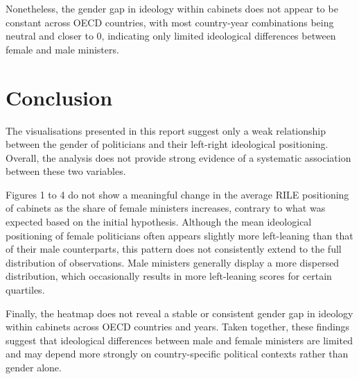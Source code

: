 \documentclass[12pt,letterpaper]{article}
\begin{document}
\noindent Nonetheless, the gender gap in ideology within cabinets does not appear to be constant across OECD countries, with most country-year combinations being neutral and closer to 0, indicating only limited ideological differences between female and male ministers.

\vspace{0.5cm}

\section{Conclusion}

\vspace{0.5cm}

\noindent The visualisations presented in this report suggest only a weak relationship between the gender of politicians and their left-right ideological positioning. Overall, the analysis does not provide strong evidence of a systematic association between these two variables.

\noindent Figures 1 to 4 do not show a meaningful change in the average RILE positioning of cabinets as the share of female ministers increases, contrary to what was expected based on the initial hypothesis. Although the mean ideological positioning of female politicians often appears slightly more left-leaning than that of their male counterparts, this pattern does not consistently extend to the full distribution of observations. Male ministers generally display a more dispersed distribution, which occasionally results in more left-leaning scores for certain quartiles.

\noindent Finally, the heatmap does not reveal a stable or consistent gender gap in ideology within cabinets across OECD countries and years. Taken together, these findings suggest that ideological differences between male and female ministers are limited and may depend more strongly on country-specific political contexts rather than gender alone.

	
\end{document}
